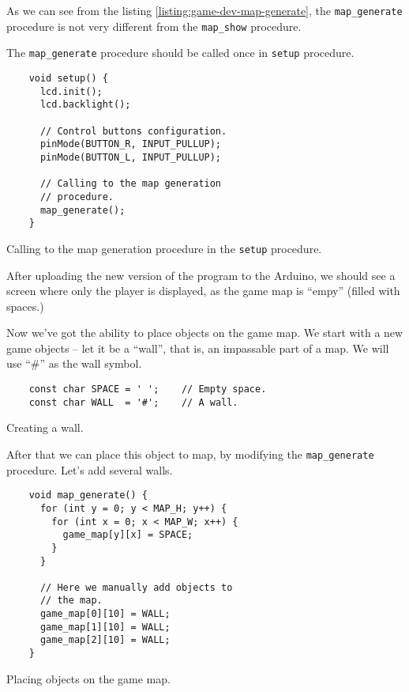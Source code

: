 \documentclass[../sparc.tex]{subfiles}
\begin{document}
As we can see from the listing \ref{listing:game-dev-map-generate}, the
\texttt{map_generate} procedure is not very different from the
\texttt{map_show} procedure.

The \texttt{map_generate} procedure should be called once in
\texttt{setup} procedure.

\begin{listing}[H]
  \begin{verbatim}
    void setup() {
      lcd.init();
      lcd.backlight();

      // Control buttons configuration.
      pinMode(BUTTON_R, INPUT_PULLUP);
      pinMode(BUTTON_L, INPUT_PULLUP);

      // Calling to the map generation
      // procedure.
      map_generate();
    }
  \end{verbatim}
  \caption{Calling to the map generation procedure in the
    \texttt{setup} procedure.}
  \label{listing:game-dev-map-generate-call}
\end{listing}

After uploading the new version of the program to the Arduino, we should see a
screen where only the player is displayed, as the game map is ``empy'' (filled
with spaces.)

Now we've got the ability to place objects on the game map. We start with a new
game objects -- let it be a ``wall'', that is, an impassable part of a map. We
will use ``\#'' as the wall symbol.

\begin{listing}[H]
  \begin{verbatim}
    const char SPACE = ' ';    // Empty space.
    const char WALL  = '#';    // A wall.
  \end{verbatim}
  \caption{Creating a wall.}
  \label{listing:game-dev-map-objects}
\end{listing}

After that we can place this object to map, by modifying the
\texttt{map_generate} procedure.  Let's add several walls.

\begin{listing}[H]
  \begin{verbatim}
    void map_generate() {
      for (int y = 0; y < MAP_H; y++) {
        for (int x = 0; x < MAP_W; x++) {
          game_map[y][x] = SPACE;
        }
      }

      // Here we manually add objects to
      // the map.
      game_map[0][10] = WALL;
      game_map[1][10] = WALL;
      game_map[2][10] = WALL;
    }
  \end{verbatim}
  \caption{Placing objects on the game map.}
  \label{listing:game-dev-map-objects-set}
\end{listing}
\end{document}
